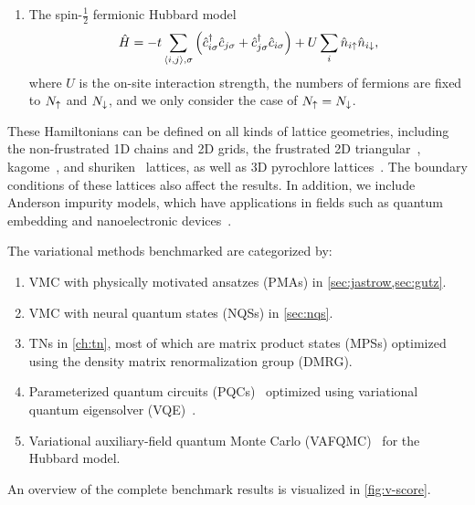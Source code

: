 \begin{enumerate}
\item The spin-$\frac{1}{2}$ fermionic Hubbard model
\begin{equation}
\hat{H} = -t \sum_{\langle i, j \rangle, \sigma} \left( \hat{c}^\dagger_{i \sigma} \hat{c}_{j \sigma} + \hat{c}^\dagger_{j \sigma} \hat{c}_{i \sigma} \right)
+ U \sum_i \hat{n}_{i {\uparrow}} \hat{n}_{i {\downarrow}},
\end{equation}
where $U$ is the on-site interaction strength, the numbers of fermions are fixed to $N_{\uparrow}$ and $N_{\downarrow}$, and we only consider the case of $N_{\uparrow} = N_{\downarrow}$.
\end{enumerate}
These Hamiltonians can be defined on all kinds of lattice geometries, including the non-frustrated 1D chains and 2D grids, the frustrated 2D triangular~\cite{li2015rare, liu2020intrinsic}, kagome~\cite{norman2016colloquium}, and shuriken~\cite{siddharthan2001square, astrakhantsev2021pinwheel} lattices, as well as 3D pyrochlore lattices~\cite{moessner1998properties, astrakhantsev2021broken}. The boundary conditions of these lattices also affect the results. In addition, we include Anderson impurity models, which have applications in fields such as quantum embedding and nanoelectronic devices~\cite{anderson1961localized, kanamori1963electron, lu2019natural, cao2021tree, cao2024vision}.

The variational methods benchmarked are categorized by:
\begin{enumerate}
\setlength{\itemsep}{0ex}
\item VMC with physically motivated ansatzes (PMAs) in \cref{sec:jastrow,sec:gutz}.
\item VMC with neural quantum states (NQSs) in \cref{sec:nqs}.
\item TNs in \cref{ch:tn}, most of which are matrix product states (MPSs) optimized using the density matrix renormalization group (DMRG).
\item Parameterized quantum circuits (PQCs)~\cite{cerezo2021variational, wecker2015progress} optimized using variational quantum eigensolver (VQE)~\cite{peruzzo2014variational, seki2020symmetry, astrakhantsev2023phenomenological}.
\item Variational auxiliary-field quantum Monte Carlo (VAFQMC)~\cite{sorella2021phase} for the Hubbard model.
\end{enumerate}

An overview of the complete benchmark results is visualized in \cref{fig:v-score}.

\newpage

